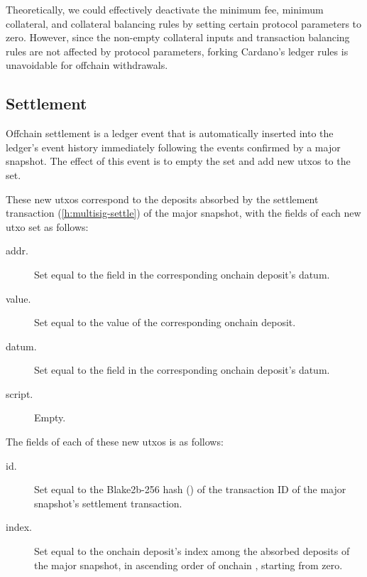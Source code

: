 \documentclass[../hydrozoa.tex]{subfiles}
\begin{document}
Theoretically, we could effectively deactivate the minimum fee, minimum collateral, and collateral balancing rules by setting certain protocol parameters to zero.
However, since the non-empty collateral inputs and transaction balancing rules are not affected by protocol parameters, forking Cardano's ledger rules is unavoidable for offchain withdrawals.

\subsection{Settlement}%
\label{h:ledger-settlement}

Offchain settlement is a ledger event that is automatically inserted into the ledger's event history immediately following the events confirmed by a major snapshot.
The effect of this event is to empty the  set and add new utxos to the  set.

These new utxos correspond to the deposits absorbed by the settlement transaction (\cref{h:multisig-settle}) of the major snapshot, with the  fields of each new utxo set as follows:
\begin{description}
  \item[addr.] Set equal to the  field in the corresponding onchain deposit's datum.
  \item[value.] Set equal to the value of the corresponding onchain deposit.
  \item[datum.] Set equal to the  field in the corresponding onchain deposit's datum.
  \item[script.] Empty.
\end{description}

The  fields of each of these new utxos is as follows:
\begin{description}
  \item[id.] Set equal to the Blake2b-256 hash () of the transaction ID of the major snapshot's settlement transaction.
  \item[index.] Set equal to the onchain deposit's index among the absorbed deposits of the major snapshot, in ascending order of onchain , starting from zero.
\end{description}
\end{document}
